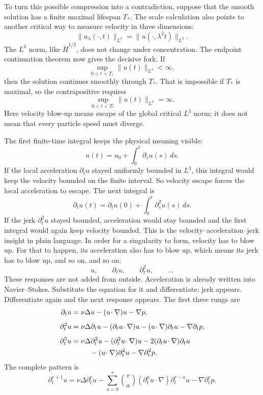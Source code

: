 To turn this possible compression into a contradiction, suppose that the smooth
solution has a finite maximal lifespan \(T_*\).  The scale calculation also
points to another critical way to measure velocity in three dimensions:
\[
\|u_\lambda(\cdot,t)\|_{L^3}
=\|u(\cdot,\lambda^2t)\|_{L^3}.
\]
The \(L^3\) norm, like \(\dot H^{1/2}\), does not change under concentration.
The endpoint continuation theorem now gives the decisive fork.  If
\[
\sup_{0<t<T_*}\|u(t)\|_{L^3}<\infty,
\]
then the solution continues smoothly through \(T_*\).  That is impossible if
\(T_*\) is maximal, so the contrapositive requires
\[
\sup_{0<t<T_*}\|u(t)\|_{L^3}=\infty.
\]
Here velocity blow-up means escape of the global critical \(L^3\) norm; it
does not mean that every particle speed must diverge.

The first finite-time integral keeps the physical meaning visible:
\[
u(t)=u_0+\int_0^t\partial_su(s)\,ds.
\]
If the local acceleration \(\partial_tu\) stayed uniformly bounded in
\(L^3\), this integral would keep the velocity bounded on the finite interval.
So velocity escape forces the local acceleration to escape.  The next integral
is
\[
\partial_tu(t)
=\partial_tu(0)+\int_0^t\partial_s^2u(s)\,ds.
\]
If the jerk \(\partial_t^2u\) stayed bounded, acceleration would stay bounded
and the first integral would again keep velocity bounded.  This is the
velocity--acceleration--jerk insight in plain language.  In order for a
singularity to form, velocity has to blow up.  For that to happen, its
acceleration also has to blow up, which means its jerk has to blow up, and so
on, and so on:
\[
u,\qquad \partial_tu,\qquad \partial_t^2u,\qquad\ldots
\]
These responses are not added from outside.  Acceleration is already written
into Navier--Stokes.  Substitute the equation for it and differentiate: jerk
appears.  Differentiate again and the next response appears.  The first three
rungs are
\[
\begin{aligned}
\partial_tu
&=\nu\Delta u-(u\!\cdot\nabla)u-\nabla p,\\[4pt]
\partial_t^2u
&=\nu\Delta\partial_tu
  -(\partial_tu\!\cdot\nabla)u
  -(u\!\cdot\nabla)\partial_tu
  -\nabla\partial_tp,\\[4pt]
\partial_t^3u
&=\nu\Delta\partial_t^2u
  -(\partial_t^2u\!\cdot\nabla)u
  -2(\partial_tu\!\cdot\nabla)\partial_tu\\
&\hspace{2.6em}
  -(u\!\cdot\nabla)\partial_t^2u
  -\nabla\partial_t^2p.
\end{aligned}
\]
The complete pattern is
\[
\partial_t^{r+1}u
=\nu\Delta\partial_t^ru
-\sum_{a=0}^{r}\binom ra
  (\partial_t^au\!\cdot\nabla)\partial_t^{r-a}u
-\nabla\partial_t^rp.
\]

